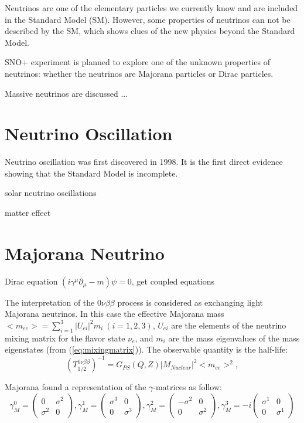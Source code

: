  

 Neutrinos are one of the elementary particles we currently know and are included in the Standard Model (SM). However, some properties of neutrinos can not be described by the SM, which shows clues of the new physics beyond the Standard Model.

SNO+ experiment is planned to explore one of the unknown properties of neutrinos: whether the neutrinos are Majorana particles or Dirac particles.



Massive neutrinos are discussed ...
\section{Neutrino Oscillation}

Neutrino oscillation was first discovered in 1998.
It is the first direct evidence showing that the Standard Model is incomplete. 


solar neutrino oscillations




matter effect





\section{Majorana Neutrino}

Dirac equation $(i\gamma^\mu\partial_\mu-m)\psi=0$,
get coupled equations


The interpretation of the $0\nu\beta\beta$ process is considered as exchanging light Majorana neutrinos. In this case the effective Majorana mass $<m_{ee}>=\sum_{i=1}^{3} |U_{ei}|^2m_i~(i=1,2,3)$, $U_{ei}$ are the elements of the neutrino mixing matrix for the flavor state $\nu_e$, and $m_i$ are the mass eigenvalues of the mass eigenstates (from (\ref{eq:mixingmatrix})). The observable quantity is the half-life:
\[
(T^{0\nu\beta\beta}_{1/2})^{-1} = G_{PS}(Q,Z)|M_{Nuclear}|^2<m_{ee}>^2, 
\]

Majorana found a representation of the $\gamma$-matrices as follow:
\[
\gamma_M^0 = \begin{pmatrix} 
0 & \sigma^2 \\
\sigma^2 & 0
\end{pmatrix},
\gamma_M^1 = \begin{pmatrix} 
\sigma^3 & 0 \\
0 & \sigma^3
\end{pmatrix},
\gamma_M^2 = \begin{pmatrix} 
-\sigma^2 & 0 \\
0 & \sigma^2
\end{pmatrix},
\gamma_M^3 = -i\begin{pmatrix} 
\sigma^1 & 0 \\
0 & \sigma^1
\end{pmatrix}
\]


